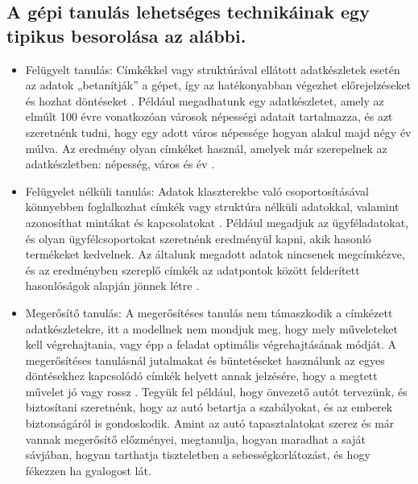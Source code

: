 \subsection{A gépi tanulás lehetséges technikáinak egy tipikus besorolása az alábbi.}
\begin{itemize}
    \item Felügyelt tanulás: Címkékkel vagy struktúrával ellátott adatkészletek esetén az adatok „betanítják” a gépet, így az hatékonyabban végezhet előrejelzéseket és hozhat döntéseket \cite{machinelearningbasics}. Például megadhatunk egy adatkészletet, amely az elmúlt 100 évre vonatkozóan városok népességi adatait tartalmazza, és azt szeretnénk tudni, hogy egy adott város népessége hogyan alakul majd négy év múlva. Az eredmény olyan címkéket használ, amelyek már szerepelnek az adatkészletben: népesség, város és év \cite{machinelearningalgorithms}.
    \item Felügyelet nélküli tanulás: Adatok klaszterekbe való csoportosításával könnyebben foglalkozhat címkék vagy struktúra nélküli adatokkal, valamint azonosíthat mintákat és kapcsolatokat \cite{machinelearningbasics}. Például megadjuk az ügyféladatokat, és olyan ügyfélcsoportokat szeretnénk eredményül kapni, akik hasonló termékeket kedvelnek. Az általunk megadott adatok nincsenek megcímkézve, és az eredményben szereplő címkék az adatpontok között felderített hasonlóságok alapján jönnek létre \cite{machinelearningalgorithms}.
    \item Megerősítő tanulás: A megerősítéses tanulás nem támaszkodik a címkézett adatkészletekre, itt a modellnek nem mondjuk meg, hogy mely műveleteket kell végrehajtania, vagy épp a feladat optimális végrehajtásának módját. A megerősítéses tanulásnál jutalmakat és büntetéseket használunk az egyes döntésekhez kapcsolódó címkék helyett annak jelzésére, hogy a megtett művelet jó vagy rossz \cite{reinforcementlearning}. Tegyük fel például, hogy önvezető autót tervezünk, és biztosítani szeretnénk, hogy az autó betartja a szabályokat, és az emberek biztonságáról is gondoskodik. Amint az autó tapasztalatokat szerez és már vannak megerősítő előzményei, megtanulja, hogyan maradhat a saját sávjában, hogyan tarthatja tiszteletben a sebességkorlátozást, és hogy fékezzen ha gyalogost lát\cite{machinelearningalgorithms}.
\end{itemize}

